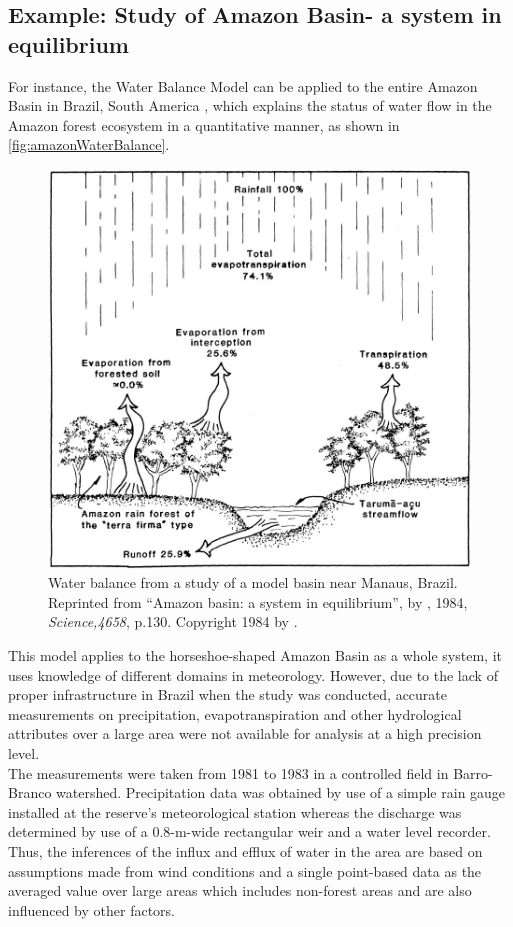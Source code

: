 \subsection{Example: Study of Amazon Basin- a system in equilibrium}
For instance, the Water Balance Model can be applied to the entire Amazon Basin in Brazil, South America  \citep{Salati1984a}, which explains the status of water flow in the Amazon forest ecosystem in a quantitative manner, as shown in \autoref{fig:amazonWaterBalance}. \\
\begin{figure}[bth]
\begin{center}
\includegraphics[width=.75\linewidth]{gfx/amazonWaterBalance}
\end{center}
\caption{Water balance from a study of a model basin near Manaus, Brazil\citep{Leopoldo1982}. Reprinted from ``Amazon basin: a system in equilibrium'', by \citeauthor{Salati1984a}, 1984, \emph{Science,4658}, p.130. Copyright 1984 by \citeauthor{Salati1984a}.  }
\label{fig:amazonWaterBalance}
\end{figure}
\newline
This model applies to the horseshoe-shaped Amazon Basin as a whole system, it uses knowledge of different domains in meteorology. However, due to the lack of proper infrastructure in Brazil when the study was conducted, accurate measurements on precipitation, evapotranspiration and other hydrological attributes over a large area were not available for analysis at a high precision level. \\
\newline
The measurements were taken from 1981 to 1983 in a controlled field in Barro-Branco watershed\citep{Leopoldo1995}. Precipitation data was obtained by use of a simple rain gauge installed at the reserve's meteorological station whereas the discharge was determined by use of a 0.8-m-wide rectangular weir and a water level recorder. Thus, the inferences of the influx and efflux of water in the area are based on assumptions made from wind conditions and a single point-based data as the averaged value over large areas which includes non-forest areas and are also influenced by other factors. 

